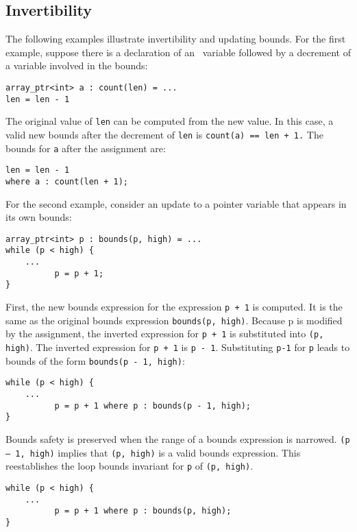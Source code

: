 \subsection{Invertibility}

The following examples illustrate invertibility and updating bounds. For
the first example, suppose there is a declaration of an
\arrayptr\ variable followed by a decrement of a variable
involved in the bounds:

\begin{verbatim}
array_ptr<int> a : count(len) = ...
len = len - 1
\end{verbatim}

The original value of \texttt{len} can be computed from the new value.
In this case, a valid new bounds after the decrement of \texttt{len} is
\texttt{count(a) == len + 1.} The bounds for \texttt{a} after the
assignment are:
\begin{verbatim}
len = len - 1
where a : count(len + 1);
\end{verbatim}

For the second example, consider an update to a pointer variable that
appears in its own bounds:
\begin{verbatim}
array_ptr<int> p : bounds(p, high) = ...         
while (p < high) {
    ...
          p = p + 1;
}
\end{verbatim}

First, the new bounds expression for the expression \verb|p + 1| is
computed. It is the same as the original bounds expression
\verb|bounds(p, high)|. Because p is modified by the assignment, the
inverted expression for \verb|p + 1| is substituted into 
\verb|(p, high)|. The inverted expression for \verb|p + 1| is \verb|p - 1|.
Substituting \verb|p-1| for \verb|p| leads to bounds of the form
\verb|bounds(p - 1, high)|:

\begin{verbatim}
while (p < high) {
    ...
          p = p + 1 where p : bounds(p - 1, high);
}
\end{verbatim}

Bounds safety is preserved when the range of a bounds expression is
narrowed. \texttt{(p -- 1, high)} implies that \texttt{(p, high)} is a
valid bounds expression. This reestablishes the loop bounds invariant
for \texttt{p} of \texttt{(p, high)}.

\begin{verbatim}
while (p < high) {
    ...
          p = p + 1 where p : bounds(p, high);
}
\end{verbatim}

